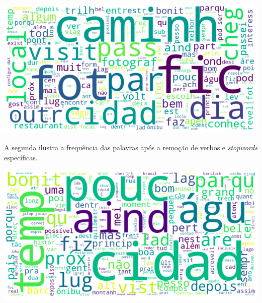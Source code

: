 \vspace{3mm} %

\includegraphics[scale=0.5]{explore/resources/nuvem_palavras_completo.png}

\vspace{3mm} %

A segunda ilustra a frequência das palavras após a remoção de verbos e \textit{stopwords} específicas.

\vspace{3mm} %

\includegraphics[scale=0.5]{explore/resources/nuvem_palavras_sem_verbos_sw.png}